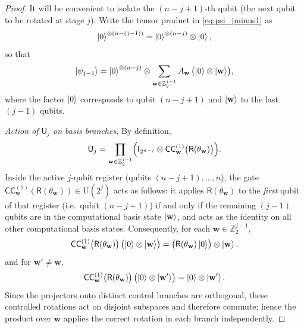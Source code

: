 \documentclass[10pt,a4paper]{amsart}
\newcommand{\CC}{\mathsf{C}\mathsf{C}}
\newcommand{\rI}{\mathsf{I}}
\newcommand{\rR}{\mathsf{R}}
\newcommand{\rU}{\mathsf{U}}
\begin{document}
\begin{proof}
It will be convenient to isolate the $(n-j+1)$-th qubit (the next qubit to be rotated at stage $j$).
Write the tensor product in \eqref{eq:psi_jminus1} as
\[
\ket{0}^{\otimes(n-(j-1))}
=\ket{0}^{\otimes(n-j)}\otimes \ket{0},
\]
so that
\begin{equation}\label{eq:psi_jminus1_rewrite}
\ket{\psi_{j-1}}
=
\ket{0}^{\otimes(n-j)}\otimes
\sum_{\mathbf{w}\in\mathbb{Z}_2^{j-1}} A_{\mathbf{w}}\,\bigl(\ket{0}\otimes\ket{\mathbf{w}}\bigr),
\end{equation}
where the factor $\ket{0}$ corresponds to qubit $(n-j+1)$ and $\ket{\mathbf{w}}$ to the last $(j-1)$ qubits.

\smallskip
\noindent\emph{Action of $\rU_j$ on basis branches.}
By definition,
\[
\rU_j=\prod_{\mathbf{w}\in\mathbb{Z}_2^{j-1}}\Bigl(\rI_{2^{n-j}}\otimes \CC_{\mathbf{w}}^{(1)}\bigl(\rR(\theta_{\mathbf{w}})\bigr)\Bigr).
\]
Inside the active $j$-qubit register (qubits $(n-j+1),\dots,n$), the gate
$\CC_{\mathbf{w}}^{(1)}(\rR(\theta_{\mathbf{w}}))\in\mathrm{U}(2^j)$ acts as follows:
it applies $\rR(\theta_{\mathbf{w}})$ to the \emph{first} qubit of that register (i.e.\ qubit $(n-j+1)$)
if and only if the remaining $(j-1)$ qubits are in the computational basis state $\ket{\mathbf{w}}$, and
acts as the identity on all other computational basis states.
Consequently, for each $\mathbf{w}\in\mathbb{Z}_2^{j-1}$,
\begin{equation}\label{eq:control_action}
\CC_{\mathbf{w}}^{(1)}\bigl(\rR(\theta_{\mathbf{w}})\bigr)\,\bigl(\ket{0}\otimes\ket{\mathbf{w}}\bigr)
=\bigl(\rR(\theta_{\mathbf{w}})\ket{0}\bigr)\otimes\ket{\mathbf{w}},
\end{equation}
and for $\mathbf{w}'\neq \mathbf{w}$,
\[
\CC_{\mathbf{w}}^{(1)}\bigl(\rR(\theta_{\mathbf{w}})\bigr)\,\bigl(\ket{0}\otimes\ket{\mathbf{w}'}\bigr)
=\ket{0}\otimes\ket{\mathbf{w}'}.
\]
Since the projectors onto distinct control branches are orthogonal, these controlled rotations act on
disjoint subspaces and therefore commute; hence the product over $\mathbf{w}$ applies the correct rotation in each
branch independently.


\end{proof}
\end{document}
